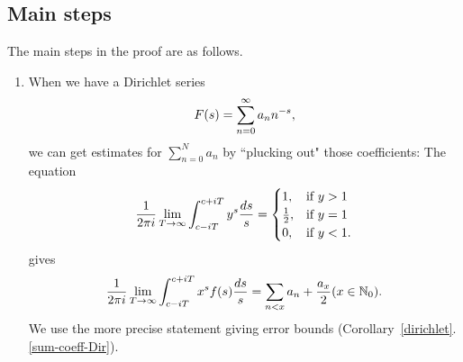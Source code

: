 \subsection{Main steps}
The main steps in the proof are as follows.
\begin{enumerate}
\item When we have a Dirichlet series
\[
F(s)=\sum_{n=0}^{\infty} a_n n^{-s},
\]
we can get estimates for $\sum_{n=0}^N a_n$ by ``plucking out" those coefficients: The equation %
\[
\frac{1}{2\pi i}\lim_{T\to\infty}\int_{c-iT}^{c+iT} y^s\frac{ds}{s}=\begin{cases}
1,&\text{if }y>1\\
\frac{1}{2},&\text{if }y=1\\
0,&\text{if }y<1.
\end{cases}
\]
gives
\[
\frac{1}{2\pi i} \lim_{T\to \infty}\int_{c-iT}^{c+iT} x^s f(s)\frac{ds}{s}=\sum_{n<x} a_n+\frac{a_x}{2}(x\in \mathbb{N}_0).
\]
We use the more precise statement giving error bounds (Corollary~\ref{dirichlet}.\ref{sum-coeff-Dir}).


\end{enumerate}
